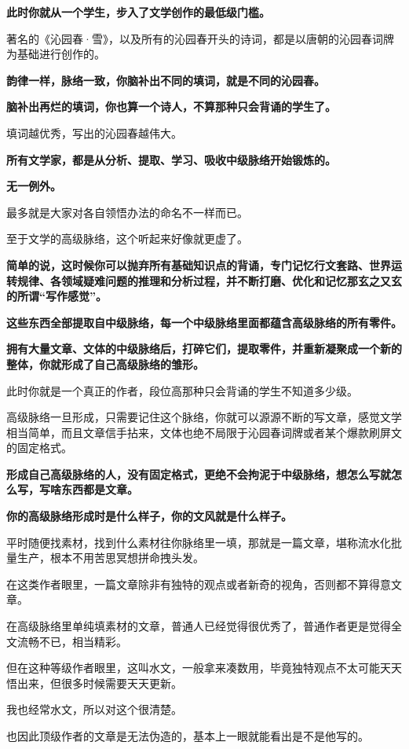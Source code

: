 \documentclass[UTF8, 11pt, oneside]{ctexart}
\newcommand{\zd}[1]{\textbf{\textcolor[RGB]{123,12,0}{#1}}} %
\begin{document}
\zd{此时你就从一个学生，步入了文学创作的最低级门槛。}

著名的《沁园春·雪》，以及所有的沁园春开头的诗词，都是以唐朝的沁园春词牌为基础进行创作的。

\zd{韵律一样，脉络一致，你脑补出不同的填词，就是不同的沁园春。}

\zd{脑补出再烂的填词，你也算一个诗人，不算那种只会背诵的学生了。}

填词越优秀，写出的沁园春越伟大。

\zd{所有文学家，都是从分析、提取、学习、吸收中级脉络开始锻炼的。}

\zd{无一例外。}

最多就是大家对各自领悟办法的命名不一样而已。

至于文学的高级脉络，这个听起来好像就更虚了。

\zd{简单的说，这时候你可以抛弃所有基础知识点的背诵，专门记忆行文套路、世界运转规律、各领域疑难问题的推理和分析过程，并不断打磨、优化和记忆那玄之又玄的所谓“写作感觉”。}

\zd{这些东西全部提取自中级脉络，每一个中级脉络里面都蕴含高级脉络的所有零件。}

\zd{拥有大量文章、文体的中级脉络后，打碎它们，提取零件，并重新凝聚成一个新的整体，你就形成了自己高级脉络的雏形。}

此时你就是一个真正的作者，段位高那种只会背诵的学生不知道多少级。

高级脉络一旦形成，只需要记住这个脉络，你就可以源源不断的写文章，感觉文学相当简单，而且文章信手拈来，文体也绝不局限于沁园春词牌或者某个爆款刷屏文的固定格式。

\zd{形成自己高级脉络的人，没有固定格式，更绝不会拘泥于中级脉络，想怎么写就怎么写，写啥东西都是文章。}

\zd{你的高级脉络形成时是什么样子，你的文风就是什么样子。}

平时随便找素材，找到什么素材往你脉络里一填，那就是一篇文章，堪称流水化批量生产，根本不用苦思冥想拼命拽头发。

在这类作者眼里，一篇文章除非有独特的观点或者新奇的视角，否则都不算得意文章。

在高级脉络里单纯填素材的文章，普通人已经觉得很优秀了，普通作者更是觉得全文流畅不已，相当精彩。

但在这种等级作者眼里，这叫水文，一般拿来凑数用，毕竟独特观点不太可能天天悟出来，但很多时候需要天天更新。

我也经常水文，所以对这个很清楚。

也因此顶级作者的文章是无法伪造的，基本上一眼就能看出是不是他写的。
\end{document}
